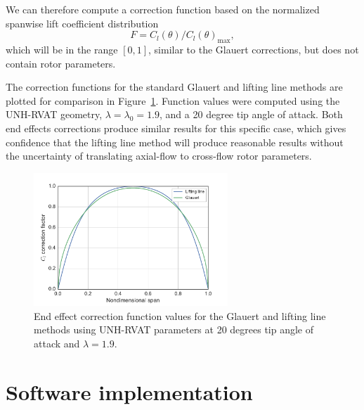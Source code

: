 \documentclass[times]{weauth}
\begin{document}
We can therefore compute a correction function based on the normalized spanwise
lift coefficient distribution
\begin{equation}
    F = C_l(\theta)/C_l(\theta)_{\max},
\end{equation}
which will be in the range $[0, 1]$, similar to the Glauert corrections, but
does not contain rotor parameters.

The correction functions for the standard Glauert and lifting line methods are
plotted for comparison in Figure~\ref{fig:end-effects}. Function values were
computed using the UNH-RVAT geometry, $\lambda = \lambda_0 = 1.9$, and a 20
degree tip angle of attack. Both end effects corrections produce similar results
for this specific case, which gives confidence that the lifting line method will
produce reasonable results without the uncertainty of translating axial-flow to
cross-flow rotor parameters.

\begin{figure}
    \centering

    \includegraphics[width=0.65\textwidth]{end-effects_rvat-20-deg}

    \caption{End effect correction function values for the Glauert and lifting
        line methods using UNH-RVAT parameters at 20 degrees tip angle of attack and
        $\lambda=1.9$.}

    \label{fig:end-effects}
\end{figure}


\section{Software implementation}
\end{document}

